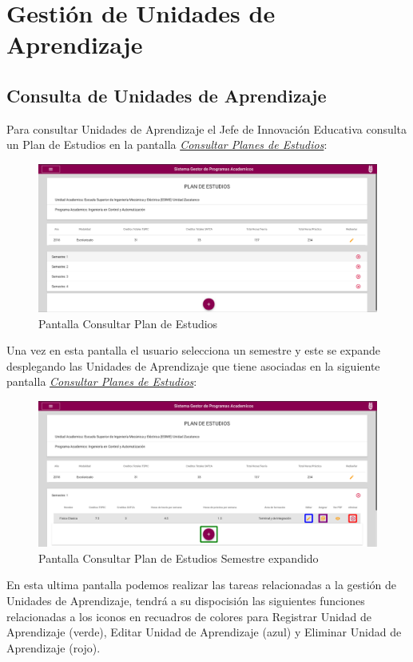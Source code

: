 \chapter{Gestión de Unidades de Aprendizaje}
    \section{Consulta de Unidades de Aprendizaje}
Para consultar Unidades de Aprendizaje el Jefe de Innovación Educativa consulta un Plan de Estudios en la pantalla \hyperlink{consultarS}{\textit{Consultar Planes de Estudios}}:\\
\begin{figure}[!hbtp]
    \centering
    \hypertarget{consultarS}{\includegraphics[width=0.7\linewidth]{images/GUA/consultarS}}
    \caption{Pantalla Consultar Plan de Estudios}
    \label{consultarS}
\end{figure}
Una vez en esta pantalla el usuario selecciona un semestre y este se expande desplegando las Unidades de Aprendizaje que tiene asociadas en la siguiente pantalla \hyperlink{consultarUA}{\textit{Consultar Planes de Estudios}}:\\
\begin{figure}[!hbtp]
    \centering
    \hypertarget{consultarUA}{\includegraphics[width=0.7\linewidth]{images/GUA/consultarUA}}
    \caption{Pantalla Consultar Plan de Estudios Semestre expandido}
    \label{consultarUA}
\end{figure}
En esta ultima pantalla podemos realizar las tareas relacionadas a la gestión de Unidades de Aprendizaje, tendrá a su dispocisión las siguientes funciones relacionadas a los iconos en recuadros de colores para Registrar Unidad de Aprendizaje (verde), Editar Unidad de Aprendizaje (azul) y Eliminar Unidad de Aprendizaje (rojo).
\newpage
